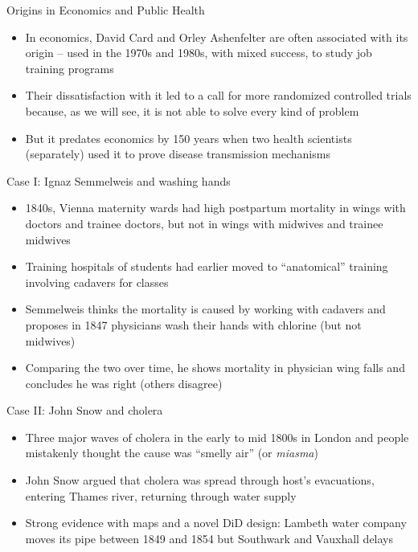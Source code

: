 \documentclass{beamer}
\begin{document}
\begin{frame}{Origins in Economics and Public Health}

\begin{itemize}
\item In economics, David Card and Orley Ashenfelter are often associated with its origin -- used in the 1970s and 1980s, with mixed success, to study job training programs
\item Their dissatisfaction with it led to a call for more randomized controlled trials because, as we will see, it is not able to solve every kind of problem
\item But it predates economics by 150 years when two health scientists (separately) used it to prove disease transmission mechanisms

\end{itemize}

\end{frame}

\begin{frame}{Case I: Ignaz Semmelweis and washing hands}

\begin{itemize}
\item 1840s, Vienna maternity wards had high postpartum mortality in wings with doctors and trainee doctors, but not in wings with midwives and trainee midwives
\item Training hospitals of students had earlier moved to ``anatomical'' training involving cadavers for classes
\item Semmelweis thinks the mortality is caused by working with cadavers and proposes in 1847 physicians wash their hands with chlorine (but not midwives)
\item Comparing the two over time, he shows mortality in physician wing falls and concludes he was right (others disagree)
\end{itemize}

\end{frame}




\begin{frame}{Case II: John Snow and cholera}

\begin{itemize}
\item Three major waves of cholera in the early to mid 1800s in London and people mistakenly thought the cause was ``smelly air'' (or \emph{miasma})
\item John Snow argued that cholera was spread through host's evacuations, entering Thames river, returning through water supply
\item Strong evidence with maps and a novel DiD design: Lambeth water company moves its pipe between 1849 and 1854 but Southwark and Vauxhall delays
\end{itemize}

\end{frame}
\end{document}
